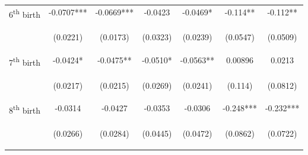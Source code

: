 \documentclass{article}[11pt,subeqn]
\begin{document}
\begin{spacing}{1.5}
\begin{sidewaystable}[!htbp]
\begin{center}
\begin{tabular}{lcccccc}
6\textsuperscript{th} birth	&	-0.0707***	&	-0.0669***	&	-0.0423	&	-0.0469*	&	-0.114**	&	-0.112**	\\  
\vspace{4pt}	& \begin{footnotesize}	(0.0221)	\end{footnotesize} & \begin{footnotesize}	(0.0173)	\end{footnotesize} & \begin{footnotesize}	(0.0323)	\end{footnotesize} & \begin{footnotesize}	(0.0239)	\end{footnotesize} & \begin{footnotesize}	(0.0547)	\end{footnotesize} & \begin{footnotesize}	(0.0509)	\end{footnotesize} \\
7\textsuperscript{th} birth	&	-0.0424*	&	-0.0475**	&	-0.0510*	&	-0.0563**	&	0.00896	&	0.0213	\\  
\vspace{4pt}	& \begin{footnotesize}	(0.0217)	\end{footnotesize} & \begin{footnotesize}	(0.0215)	\end{footnotesize} & \begin{footnotesize}	(0.0269)	\end{footnotesize} & \begin{footnotesize}	(0.0241)	\end{footnotesize} & \begin{footnotesize}	(0.114)	\end{footnotesize} & \begin{footnotesize}	(0.0812)	\end{footnotesize} \\
8\textsuperscript{th} birth	&	-0.0314	&	-0.0427	&	-0.0353	&	-0.0306	&	-0.248***	&	-0.232***	\\  
	& \begin{footnotesize}	(0.0266)	\end{footnotesize} & \begin{footnotesize}	(0.0284)	\end{footnotesize} & \begin{footnotesize}	(0.0445)	\end{footnotesize} & \begin{footnotesize}	(0.0472)	\end{footnotesize} & \begin{footnotesize}	(0.0862)	\end{footnotesize} & \begin{footnotesize}	(0.0722)	\end{footnotesize} \\

\end{tabular}
\end{center}
\end{sidewaystable}
\end{spacing}
\end{document}
